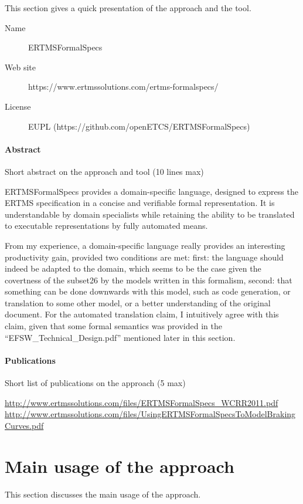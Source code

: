 This section gives a quick presentation of the approach and the tool.

\begin{description}
\item[Name] ERTMSFormalSpecs
\item[Web site] https://www.ertmssolutions.com/ertms-formalspecs/
\item[License] EUPL (https://github.com/openETCS/ERTMSFormalSpecs)
\end{description}

\paragraph{Abstract} Short abstract on the approach and tool (10 lines max)

ERTMSFormalSpecs provides a domain-specific language, designed to express the ERTMS specification in a concise and verifiable formal representation. It is understandable by domain specialists while retaining the ability to be translated to executable representations by fully automated means.

\begin{assessor1}
From my experience, a domain-specific language really provides an interesting productivity gain, provided two conditions are met: first: the language should indeed be adapted to the domain, which seems to be the case given the covertness of the subset26 by the models written in this formalism, second: that something can be done downwards with this model, such as code generation, or translation to some other model, or a better understanding of the original document. 
For the automated translation claim, I intuitively agree with this claim, given that some formal semantics was provided in the "`EFSW\_Technical\_Design.pdf"' mentioned later in this section. 
\end{assessor1}

\paragraph{Publications} Short list of publications on the approach (5 max)

\url{http://www.ertmssolutions.com/files/ERTMSFormalSpecs\_WCRR2011.pdf   }
\url{http://www.ertmssolutions.com/files/UsingERTMSFormalSpecsToModelBrakingCurves.pdf}

\section{Main usage of the approach}
\label{main_usage}
This section discusses the main usage of the approach.

